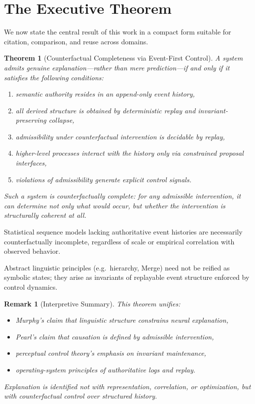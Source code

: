 \documentclass[11pt]{article}
\newtheorem{remark}{Remark}
\newtheorem{theorem}{Theorem}
\begin{document}
\section{The Executive Theorem}
\label{sec:executive_theorem}

We now state the central result of this work in a compact form suitable for citation, comparison, and reuse across domains.

\begin{theorem}[Counterfactual Completeness via Event-First Control]
\label{thm:executive}
A system admits genuine explanation—rather than mere prediction—if and only if it satisfies the following conditions:
\begin{enumerate}
  \item semantic authority resides in an append-only event history,
  \item all derived structure is obtained by deterministic replay and invariant-preserving collapse,
  \item admissibility under counterfactual intervention is decidable by replay,
  \item higher-level processes interact with the history only via constrained proposal interfaces,
  \item violations of admissibility generate explicit control signals.
\end{enumerate}
Such a system is \emph{counterfactually complete}: for any admissible intervention, it can determine not only what would occur, but whether the intervention is structurally coherent at all.
\end{theorem}

\begin{corollary}
Statistical sequence models lacking authoritative event histories are necessarily counterfactually incomplete, regardless of scale or empirical correlation with observed behavior.
\end{corollary}

\begin{corollary}
Abstract linguistic principles (e.g.\ hierarchy, Merge) need not be reified as symbolic states; they arise as invariants of replayable event structure enforced by control dynamics.
\end{corollary}

\begin{remark}[Interpretive Summary]
This theorem unifies:
\begin{itemize}
  \item Murphy’s claim that linguistic structure constrains neural explanation,
  \item Pearl’s claim that causation is defined by admissible intervention,
  \item perceptual control theory’s emphasis on invariant maintenance,
  \item operating-system principles of authoritative logs and replay.
\end{itemize}
Explanation is identified not with representation, correlation, or optimization, but with \emph{counterfactual control over structured history}.
\end{remark}
\end{document}
